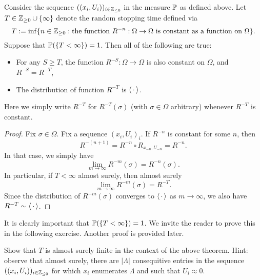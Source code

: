 \begin{theorem}
    \label{thm:coupling_from_the_past}
    Consider the sequence $((x_i,U_i))_{i\in\Z_{\leq 0}}$ in the measure $\P$ as defined above.
    Let $T\in\Z_{\geq 0}\cup\{\infty\}$ denote the random stopping time
    defined via
    \[
        T:=\inf\{n\in\Z_{\geq 0}:\text{the function $R^{-n}:\Omega\to\Omega$ is constant as a function on $\Omega$}\}.
    \]
    Suppose that $\P(\{T<\infty\})=1$.
    Then all of the following are true:
    \begin{itemize}
        \item For any $S\geq T$, the function $R^{-S}:\Omega\to\Omega$ is also constant on $\Omega$, and $R^{-S}=R^{-T}$,
        \item The distribution of function $R^{-T}$ is $\langle\blank\rangle$.
    \end{itemize}
    Here we simply write $R^{-T}$ for $R^{-T}(\sigma)$ (with $\sigma\in\Omega$ arbitrary)
    whenever $R^{-T}$ is constant.
\end{theorem}

\begin{proof}
    Fix $\sigma\in\Omega$.
    Fix a sequence $(x_i,U_i)_i$.
    If $R^{-n}$ is constant for some $n$, then
    \[
            R^{-(n+1)}=R^{-n}\circ R_{x_{-n},U_{-n}}=R^{-n}.
    \]
    In that case, we simply have
    \[
        \lim_{m\to\infty}R^{-m}(\sigma)=R^{-n}(\sigma).
    \]
    In particular, if $T<\infty$ almost surely,
    then almost surely
    \[
        \lim_{m\to\infty} R^{-m}(\sigma)=R^{-T}.
    \]
    Since the distribution of $R^{-m}(\sigma)$ converges to $\langle\blank\rangle$
    as $m\to\infty$,
    we also have $R^{-T}\sim\langle\blank\rangle$.
\end{proof}

It is clearly important that $\P(\{T<\infty\})=1$.
We invite the reader to prove this in the following exercise.
Another proof is provided later.

\begin{exercise}
    Show that $T$ is almost surely finite
    in the context of the above theorem.
    Hint: observe that almost surely,
    there are $|\Lambda|$ consequitive entries in the sequence $((x_i,U_i))_{i\in\Z_{\leq 0}}$
    for which $x_i$ enumerates $\Lambda$ and such that $U_i\approx 0$.
\end{exercise}

